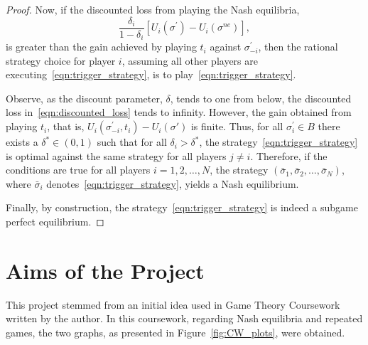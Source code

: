 \begin{proof}
    Now, if the discounted loss from playing the Nash equilibria,
    \begin{equation}
        \frac{\delta_{i}}{1-\delta_{i}}[U_{i}(\sigma^{\prime}) -
        U_{i}(\sigma^{ne})],
    \end{equation}\label{eqn:discounted_loss}
    is greater than the gain achieved by playing
    \(t_{i}\) against \(\sigma_{-i}^{\prime}\), then the rational
    strategy choice for player \(i\), assuming all other players are
    executing~\ref{eqn:trigger_strategy}, is to play~\ref{eqn:trigger_strategy}.
    
    Observe, as the discount parameter, \(\delta \), tends to one from
    below, the discounted loss in~\ref{eqn:discounted_loss} tends to infinity.
    However, the gain obtained from playing \(t_{i}\), that is,
    \(U_{i}(\sigma_{-i}^{\prime}, t_{i}) - U_{i}(\sigma{\prime})\) is finite.
    Thus, for all \(\sigma_{i}^{\prime} \in B\) there exists a \(\delta^{*} \in
    (0, 1)\) such that for all \(\delta_{i} > \delta^{*}\), the
    strategy~\ref{eqn:trigger_strategy} is optimal against the same strategy for
    all players \(j \ne i\). Therefore, if the conditions are true for all
    players \(i = 1,2,\ldots,N\), the strategy \((\bar{\sigma}_{1},
    \bar{\sigma}_{2}, \ldots, \bar{\sigma}_{N})\), where  \(\bar{\sigma}_{i}\)
    denotes~\ref{eqn:trigger_strategy}, yields a Nash equilibrium.

    Finally, by construction, the strategy~\ref{eqn:trigger_strategy} is indeed
    a subgame perfect equilibrium. 
\end{proof}

\section{Aims of the Project}\label{sec:Aims_of_the_Project}
This project stemmed from an initial idea used in Game Theory Coursework
written by the author. In this coursework, regarding Nash equilibria and
repeated games, the two graphs, as presented in Figure~\ref{fig:CW_plots}, were
obtained.


